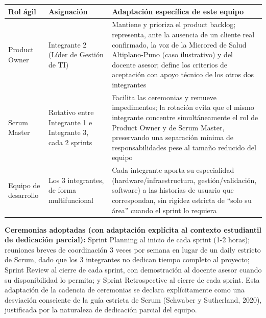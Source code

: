 \documentclass[11pt,a4paper]{article}
\begin{document}
{\small
\begin{longtable}[]{@{}
  >{\raggedright\arraybackslash}p{}
  >{\raggedright\arraybackslash}p{}
  >{\raggedright\arraybackslash}p{}@{}}
\toprule\noalign{}
\begin{minipage}[b]{\linewidth}\raggedright
Rol ágil
\end{minipage} & \begin{minipage}[b]{\linewidth}\raggedright
Asignación
\end{minipage} & \begin{minipage}[b]{\linewidth}\raggedright
Adaptación específica de este equipo
\end{minipage} \\
\midrule\noalign{}
\endhead
\bottomrule\noalign{}
\endlastfoot
Product Owner & Integrante 2 (Líder de Gestión de TI) & Mantiene y prioriza el product backlog; representa, ante la ausencia de un cliente real confirmado, la voz de la Microred de Salud Altiplano-Puno (caso ilustrativo) y del docente asesor; define los criterios de aceptación con apoyo técnico de los otros dos integrantes \\
Scrum Master & Rotativo entre Integrante 1 e Integrante 3, cada 2 sprints & Facilita las ceremonias y remueve impedimentos; la rotación evita que el mismo integrante concentre simultáneamente el rol de Product Owner y de Scrum Master, preservando una separación mínima de responsabilidades pese al tamaño reducido del equipo \\
Equipo de desarrollo & Los 3 integrantes, de forma multifuncional & Cada integrante aporta su especialidad (hardware/infraestructura, gestión/validación, software) a las historias de usuario que correspondan, sin rigidez estricta de ``solo su área'' cuando el sprint lo requiera \\
\end{longtable}
}

\textbf{Ceremonias adoptadas (con adaptación explícita al contexto estudiantil de dedicación parcial):} Sprint Planning al inicio de cada sprint (1-2 horas); reuniones breves de coordinación 3 veces por semana en lugar de un daily estricto de Scrum, dado que los 3 integrantes no dedican tiempo completo al proyecto; Sprint Review al cierre de cada sprint, con demostración al docente asesor cuando su disponibilidad lo permita; y Sprint Retrospective al cierre de cada sprint. Esta adaptación de la cadencia de ceremonias se declara explícitamente como una desviación consciente de la guía estricta de Scrum (Schwaber y Sutherland, 2020), justificada por la naturaleza de dedicación parcial del equipo.
\end{document}
